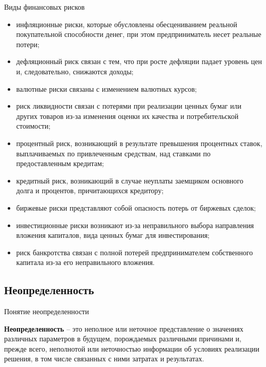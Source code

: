\documentclass[_fin_decisions_lectures.tex]{subfiles}
\begin{document}
\begin{frame}[allowframebreaks]{Виды финансовых рисков}
\begin{itemize}
\item
	инфляционные риски, которые обусловлены обесцениванием реальной покупательной способности денег, при этом предприниматель несет реальные потери;
\item
	дефляционный риск связан с тем, что при росте дефляции падает уровень цен и, следовательно, снижаются доходы;
\item
	валютные риски связаны с изменением валютных курсов;
	\pagebreak
\item
	риск ликвидности связан с потерями при реализации ценных бумаг или других товаров из-за изменения оценки их качества и потребительской стоимости;
\item
	процентный риск, возникающий в результате превышения процентных ставок, выплачиваемых по привлеченным средствам, над ставками по предоставленным кредитам;
\item
	кредитный риск, возникающий в случае неуплаты заемщиком основного долга и процентов, причитающихся кредитору;
\pagebreak
\item
	биржевые риски представляют собой опасность потерь от биржевых сделок;
\item
	инвестиционные риски возникают из-за неправильного выбора направления вложения капиталов, вида ценных бумаг для инвестирования;
\item
	риск банкротства связан с полной потерей предпринимателем собственного капитала из-за его неправильного вложения.
\end{itemize}
\end{frame}


\subsection{Неопределенность}
\begin{frame}{Понятие неопределенности}
\begin{block}{\textbf{Неопределенность}}
\quad – это неполное или неточное представление о значениях различных параметров в будущем, порождаемых различными причинами и, прежде всего, неполнотой или неточностью информации об условиях реализации решения, в том числе связанных с ними затратах и результатах. 
\end{block}

\end{frame}
\end{document}
